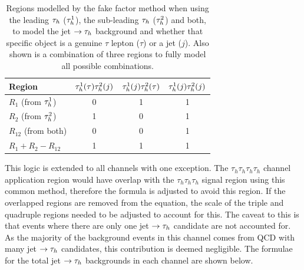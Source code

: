\begin{table}[H]
\centering
\begin{tabular}{|l|ccc|}
\hline
Region    & $\tau_{h}^1 (\tau) \tau_{h}^2 (j)$ & $\tau_{h}^1 (j) \tau_{h}^2 (\tau)$ & $\tau_{h}^1 (j) \tau_{h}^2 (j)$ \\
\hline
\hline
$R_{1}$ (from $\tau_{h}^1$)     & 0                            & 1                            & 1                         \\
$R_{2}$ (from $\tau_{h}^2$)     & 1                            & 0                            & 1                         \\
$R_{12}$ (from both)         & 0                            & 0                            & 1                         \\
\hline
$R_{1} +R_{2} - R_{12}$      & 1                            & 1                            & 1       \\                  
\hline
\end{tabular}
\caption{Regions modelled by the fake factor method when using the leading $\tau_{h}$ ($\tau_{h}^1$), the sub-leading $\tau_{h}$ ($\tau_{h}^2$) and both, to model the jet $\rightarrow \tau_{h}$ background and whether that specific object is a genuine $\tau$ lepton ($\tau$) or a jet ($j$). Also shown is a combination of three regions to fully model all possible combinations. }
\label{tab:apply_ff}
\end{table}

This logic is extended to all channels with one exception.
The $\tau_h \tau_h \tau_h \tau_h$ channel application region would have overlap with the $\tau_h \tau_h \tau_h$ signal region using this common method, therefore the formula is adjusted to avoid this region.
If the overlapped regions are removed from the equation, the scale of the triple and quadruple regions needed to be adjusted to account for this.
The caveat to this is that events where there are only one jet $\rightarrow \tau_{h}$ candidate are not accounted for.
As the majority of the background events in this channel comes from QCD with many jet $\rightarrow \tau_{h}$ candidates, this contribution is deemed negligible.
The formulae for the total jet $\rightarrow \tau_{h}$ backgrounds in each channel are shown below. \\

